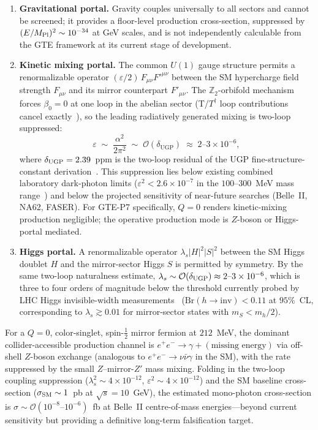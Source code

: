 \documentclass[12pt]{article}
\numberwithin{equation}{section}
\begin{document}
\begin{enumerate}[nosep,label=(\roman*)]

\item \textbf{Gravitational portal.}
Gravity couples universally to all sectors and cannot be screened; it provides
a floor-level production cross-section, suppressed by $(E/M_{\rm Pl})^2\sim 10^{-34}$
at GeV scales, and is not independently calculable from the GTE framework
at its current stage of development.

\item \textbf{Kinetic mixing portal.}
The common $U(1)$ gauge structure permits a renormalizable operator
$(\varepsilon/2)\,F_{\mu\nu}F'^{\mu\nu}$
between the SM hypercharge field strength $F_{\mu\nu}$ and its mirror counterpart
$F'_{\mu\nu}$.
The $\mathbb{Z}_2$-orbifold mechanism forces $\beta_0 = 0$ at one loop
in the abelian sector (T/$T^\dagger$ loop contributions cancel
exactly~\cite{SpivackDeeperTheory}), so the leading radiatively generated
mixing is two-loop suppressed:
\[
  \varepsilon \;\sim\; \frac{\alpha^2}{2\pi^2}
    \;\sim\; \mathcal{O}(\delta_{\mathrm{UGP}})
    \;\approx\; 2\text{--}3\times10^{-6},
\]
where $\delta_{\rm UGP} = 2.39$~ppm is the two-loop residual of the
UGP fine-structure-constant derivation~\cite{SpivackDeeperTheory}.
This suppression lies below existing combined laboratory dark-photon limits
($\varepsilon^2 < 2.6\times10^{-7}$ in the $100$--$300$~MeV mass range~\cite{NA622023darkphoton,ParticleDataGroup2024})
and below the projected sensitivity of near-future searches
(Belle~II, NA62, FASER).
For GTE-P7 specifically, $Q=0$ renders kinetic-mixing production negligible;
the operative production mode is $Z$-boson or Higgs-portal mediated.

\item \textbf{Higgs portal.}
A renormalizable operator $\lambda_s|H|^2|S|^2$ between the SM Higgs doublet $H$
and the mirror-sector Higgs $S$ is permitted by symmetry.
By the same two-loop naturalness estimate,
$\lambda_s \sim \mathcal{O}(\delta_{\rm UGP}) \approx 2\text{--}3\times10^{-6}$,
which is three to four orders of magnitude below the threshold currently
probed by LHC Higgs invisible-width measurements~\cite{ParticleDataGroup2022}
($\mathrm{Br}(h\to\mathrm{inv}) < 0.11$ at $95\%$~CL,
corresponding to $\lambda_s \gtrsim 0.01$ for mirror-sector states with
$m_S < m_h/2$).

\end{enumerate}

For a $Q=0$, color-singlet, spin-$\frac{1}{2}$ mirror fermion at $212$~MeV,
the dominant collider-accessible production channel is
$e^+e^-\to\gamma+(\text{missing energy})$ via off-shell $Z$-boson exchange
(analogous to $e^+e^-\to\nu\bar\nu\gamma$ in the SM), with the rate suppressed
by the small $Z$--mirror-$Z'$ mass mixing.
Folding in the two-loop coupling suppression
($\lambda_s^2\sim 4\times10^{-12}$, $\varepsilon^2\sim 4\times10^{-12}$)
and the SM baseline cross-section
($\sigma_{\rm SM}\sim 1$~pb at $\sqrt{s}=10$~GeV),
the estimated mono-photon cross-section is
$\sigma\sim\mathcal{O}(10^{-8}\text{--}10^{-6})$~fb
at Belle~II centre-of-mass energies---beyond current sensitivity
but providing a definitive long-term falsification target.
\end{document}
